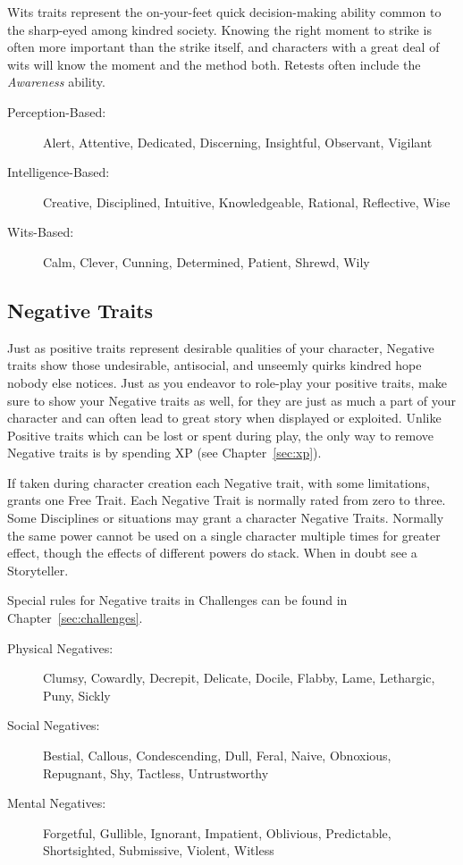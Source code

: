 Wits traits represent the on-your-feet quick decision-making ability 
common to the sharp-eyed among kindred society.  Knowing the right moment 
to strike is often more important than the strike itself, and characters 
with a great deal of wits will know the moment and the method both.  
Retests often include the \emph{Awareness} ability.

\begin{description}
	\item[Perception-Based:]  Alert, Attentive, Dedicated, Discerning, 
	Insightful, Observant, Vigilant
	\item[Intelligence-Based:]  Creative, Disciplined, Intuitive, 
	Knowledgeable, Rational, Reflective, Wise
	\item[Wits-Based:]  Calm, Clever, Cunning, Determined, Patient, Shrewd, 
	Wily
\end{description}

\subsection{Negative Traits}
Just as positive traits represent desirable qualities of your character, 
Negative traits show those undesirable, antisocial, and unseemly quirks 
kindred hope nobody else notices.  Just as you endeavor to role-play your 
positive traits, make sure to show your Negative traits as well, for they are 
just as much a part of your character and can often lead to great story 
when displayed or exploited.  Unlike Positive traits which can be lost or spent during play, 
the only way to remove Negative traits is by spending XP (see Chapter~\ref{sec:xp}).

If taken during character creation each Negative trait, with some limitations, 
grants one Free Trait.  Each Negative Trait is normally rated from zero to three.  Some 
Disciplines or situations may grant a character Negative Traits.  Normally the same power 
cannot be used on a single character multiple times for greater effect, though the effects of 
different powers do stack.  When in doubt see a Storyteller.

Special rules for Negative traits in Challenges can be found in Chapter~\ref{sec:challenges}.  

\begin{description}
	\item[Physical Negatives:]  Clumsy, Cowardly, Decrepit, Delicate, Docile, 
	Flabby, Lame, Lethargic, Puny, Sickly
	\item[Social Negatives:]  Bestial, Callous, Condescending, Dull, Feral, 
	Naive, Obnoxious, Repugnant, Shy, Tactless, Untrustworthy
	\item[Mental Negatives:]  Forgetful, Gullible, Ignorant, Impatient, 
	Oblivious, Predictable, Shortsighted, Submissive, Violent, Witless
\end{description}